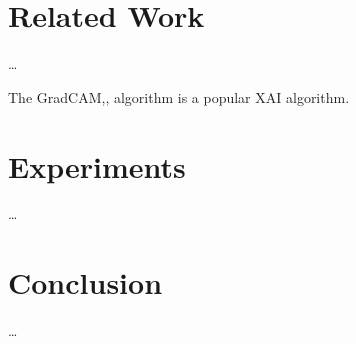 \documentclass[12pt]{article}
\begin{document}
\section{Related Work}
\ldots

The GradCAM,\cite{selvarajuGradCAMVisualExplanations2020}, algorithm is a popular XAI algorithm. 
\section{Experiments}
\ldots

\section{Conclusion}
\ldots

\newpage
\begin{footnotesize} %
\singlespacing %
\setlength{\bibsep}{5pt} %
\thispagestyle{empty} %
\end{footnotesize} %
\end{document}
